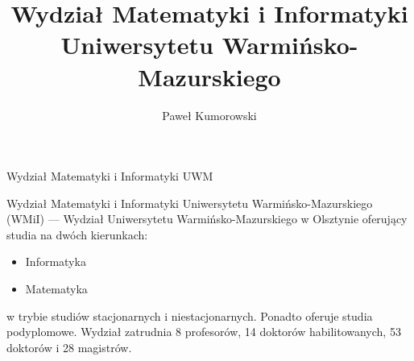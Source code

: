 \documentclass[a4paper,12pt]{article}
\title{Wydział Matematyki i Informatyki Uniwersytetu Warmińsko-Mazurskiego}
\author{Paweł Kumorowski}
\begin{document}
\maketitle
Wydział Matematyki i Informatyki UWM
\begin{abstract}

\end{abstract}
Wydział Matematyki i Informatyki Uniwersytetu Warmińsko-Mazurskiego (WMiI) --- Wydział Uniwersytetu Warmińsko-Mazurskiego w Olsztynie oferujący studia na dwóch kierunkach:
\begin{itemize}
\item Informatyka
\item Matematyka
\end{itemize}
w trybie studiów stacjonarnych i niestacjonarnych. Ponadto oferuje studia podyplomowe.
\newline
Wydział zatrudnia 8 profesorów, 14 doktorów habilitowanych, 53 doktorów i 28 magistrów.
\tableofcontents
\begin{itemize}

\end{itemize}
\section{}
\end{document}
